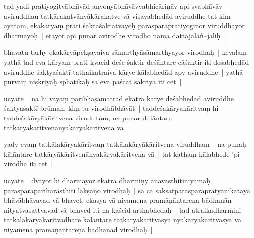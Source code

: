 \documentclass[article,12pt,a4paper]{memoir}%
\newcounter{parCount}
\begin{document}
	  
	  \pstart \leavevmode%
	\label{thakur75-78.12}tad yadi pratiyogitvābhāvād anyonyābhāvāvyabhicāriṇāv api svabhāvāv aviruddhau tatkārakatvānyākārakatve vā viṣayabhedād aviruddhe tat kim āyātam, ekakāryaṃ prati śaktāśaktatvayoḥ parasparapratiyoginor viruddhayor dharmayoḥ | etayor api punar avirodhe virodho nāma dattajalāñ–jaliḥ ||
	{}
	\pend%
      

	  
	  \pstart \leavevmode%
	\label{thakur75-78.16}bhavatu tarhy ekakāryāpekṣayaiva sāmarthyāsāmarthyayor virodhaḥ | kevalaṃ yathā tad eva kāryaṃ prati kvacid deśe śaktir deśāntare cāśaktir iti deśabhedād aviruddhe śaktyaśaktī tathaikatraiva kārye kālabhedād apy aviruddhe | yathā pūrvaṃ niṣkriyaḥ sphaṭikaḥ sa eva paścāt sakriya iti cet |
	{}
	\pend%
      

	  
	  \pstart \leavevmode%
	\label{thakur75-78.19}ucyate | na hi vayaṃ paribhāṣāmātrād ekatra kārye deśabhedād aviruddhe śaktyaśaktī brūmaḥ, kiṃ tu virodhābhāvāt | taddeśakāryakāritvaṃ hi taddeśakāryākāritvena viruddham, na punar deśāntare tatkāryākāritvenānyakāryakāritvena vā ||
	{}
	\pend%
      

	  
	  \pstart \leavevmode%
	\label{thakur75-78.23}yady evaṃ tatkālakāryakāritvaṃ tatkālakāryākāritvena viruddham | na punaḥ kālāntare tatkāryākāritvenānyakāryakāritvena vā | tat kathaṃ kālabhede 'pi virodha iti cet |
	{}
	\pend%
      

	  
	  \pstart \leavevmode%
	\label{thakur75-78.25}ucyate | dvayor hi dharmayor ekatra dharmiṇy anavasthitiniyamaḥ parasparaparihārasthiti lakṣaṇo virodhaḥ | sa ca sākṣātparasparapratyanīkatayā bhāvābhāvavad vā bhavet, ekasya vā niyamena pramāṇāntareṇa bādhanān nityatvasattvavad vā bhaved iti na kaścid arthabhedaḥ | tad atraikadharmiṇi tatkālakāryakāritvādhāre kālāntare tatkāryākāritvasyā nyakāryakāritvasya vā niyamena pramāṇāntareṇa bādhanād virodhaḥ | 
	{}
	\pend%
      
\end{document}
